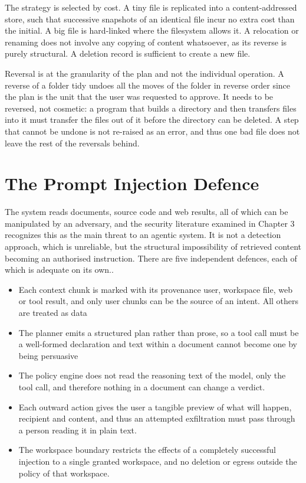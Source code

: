 \documentclass{FastFyp}
\begin{document}
The strategy is selected by cost. A tiny file is replicated into a content-addressed store, such that successive snapshots of an identical file incur no extra cost than the initial. A big file is hard-linked where the filesystem allows it. A relocation or renaming does not involve any copying of content whatsoever, as its reverse is purely structural. A deletion record is sufficient to create a new file.

Reversal is at the granularity of the plan and not the individual operation. A reverse of a folder tidy undoes all the moves of the folder in reverse order since the plan is the unit that the user was requested to approve. It needs to be reversed, not cosmetic: a program that builds a directory and then transfers files into it must transfer the files out of it before the directory can be deleted. A step that cannot be undone is not re-raised as an error, and thus one bad file does not leave the rest of the reversals behind.

\section{The Prompt Injection Defence}
The system reads documents, source code and web results, all of which can be manipulated by an adversary, and the security literature examined in Chapter 3 recognizes this as the main threat to an agentic system. It is not a detection approach, which is unreliable, but the structural impossibility of retrieved content becoming an authorised instruction. There are five independent defences, each of which is adequate on its own..

\begin{itemize}
    \item Each context chunk is marked with its provenance user, workspace file, web or tool result, and only user chunks can be the source of an intent. All others are treated as data
    \item The planner emits a structured plan rather than prose, so a tool call must be a well-formed declaration and text within a document cannot become one by being persuasive
    \item The policy engine does not read the reasoning text of the model, only the tool call, and therefore nothing in a document can change a verdict.
    \item Each outward action gives the user a tangible preview of what will happen, recipient and content, and thus an attempted exfiltration must pass through a person reading it in plain text.
    \item The workspace boundary restricts the effects of a completely successful injection to a single granted workspace, and no deletion or egress outside the policy of that workspace.
\end{itemize}
\end{document}
